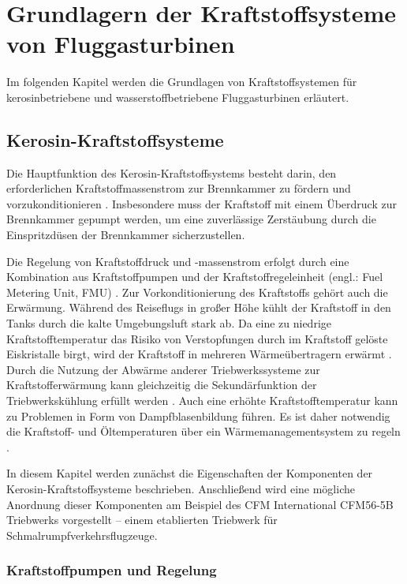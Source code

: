 \chapter{Grundlagern der Kraftstoffsysteme von Fluggasturbinen}\label{chap:grundlagen}

Im folgenden Kapitel werden die Grundlagen von Kraftstoffsystemen für kerosinbetriebene und wasserstoffbetriebene Fluggasturbinen erläutert.

\section{Kerosin-Kraftstoffsysteme}

Die Hauptfunktion des Kerosin-Kraftstoffsystems besteht darin, den erforderlichen Kraftstoffmassenstrom zur Brennkammer zu fördern und vorzukonditionieren \cite{Jackson.2015}. Insbesondere muss der Kraftstoff mit einem Überdruck zur Brennkammer gepumpt werden, um eine zuverlässige Zerstäubung durch die Einspritzdüsen der Brennkammer sicherzustellen. 

Die Regelung von Kraftstoffdruck und  -massenstrom erfolgt durch eine Kombination aus Kraftstoffpumpen und der Kraftstoffregeleinheit (engl.: Fuel Metering Unit, FMU) \cite{Braunling.2015}. Zur Vorkonditionierung des Kraftstoffs gehört auch die Erwärmung. Während des Reiseflugs in großer Höhe kühlt der Kraftstoff in den Tanks durch die kalte Umgebungsluft stark ab. Da eine zu niedrige Kraftstofftemperatur das Risiko von Verstopfungen durch im Kraftstoff gelöste Eiskristalle birgt, wird der Kraftstoff in mehreren Wärmeübertragern erwärmt \cite{Doman.2015}. Durch die Nutzung der Abwärme anderer Triebwerkssysteme zur Kraftstofferwärmung kann gleichzeitig die Sekundärfunktion der Triebwerkskühlung erfüllt werden \cite{Braunling.2015, Jackson.2015}. Auch eine erhöhte Kraftstofftemperatur kann zu Problemen in Form von Dampfblasenbildung führen. Es ist daher notwendig die Kraftstoff- und Öltemperaturen über ein Wärmemanagementsystem zu regeln \cite{Braunling.2015}. 

In diesem Kapitel werden zunächst die Eigenschaften der Komponenten der Kerosin-Kraftstoffsysteme beschrieben. Anschließend wird eine mögliche Anordnung dieser Komponenten am Beispiel des CFM International CFM56-5B Triebwerks vorgestellt – einem etablierten Triebwerk für Schmalrumpfverkehrsflugzeuge.



\subsection{Kraftstoffpumpen und Regelung}

